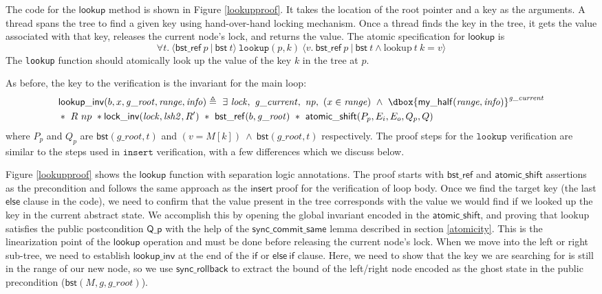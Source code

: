 \documentclass[acmsmall,screen]{acmart}\settopmatter{printfolios=true}
\newcommand\dboxed[1]{\dbox{\ensuremath{#1}}}
\newcommand{\ghost}[2]{\ensuremath{\dboxed{#1}^{#2}}}
\newcommand{\treerep}{\ensuremath{\mathsf{bst}}}
\newcommand{\nodeboxrep}{\ensuremath{\mathsf{bst\_ref}}}
\begin{document}
The code for the $\mathsf{lookup}$ method is shown in Figure
\ref{lookupproof}. It takes the location of the root pointer and a key
as the arguments. A thread spans the tree to find a given key using
hand-over-hand locking mechanism. Once a thread finds the key in the
tree, it gets the value associated with that key, releases the current
node's lock, and returns the value.
The atomic specification for $\mathsf{lookup}$ is
$$\forall t.\ \langle \nodeboxrep\ p\ |\ \treerep\ t\rangle\ \texttt{lookup}(p, k)\ \langle v.\ \nodeboxrep\ p\ |\ \treerep\ t \land \mathrm{lookup}\ t\ k = v\rangle$$
The \texttt{lookup} function should atomically look up the value of the key $k$ in the tree at $p$.

As before, the key to the verification is the invariant for the main loop:
\begin{align*} &\mathsf{lookup\_inv}(b, x, \mathit{g\_root}, \mathit{range},\mathit{info}) \triangleq\ \exists\ \mathit{lock},\ \mathit{g\_current},\ \mathit{np},\ (x\in \mathit{range})\ \land \ \ghost{\mathsf{my\_half}(\mathit{range},\mathit{info})}{\mathit{g\_current}}\\& *\ R\ np\ * \mathsf{lock\_inv}(\mathit{lock},\mathit{lsh2},R')\ *\ \nodeboxrep(b,\mathit{g\_root})\ *\ \mathsf{atomic\_shift} (P_p,E_i,E_o,Q_p,Q) \end{align*}
where $P_p$ and $Q_p$ are $\treerep(g\_root, t)$ and $(v =
M[k])\ \wedge\ \treerep(g\_root, t)$ respectively. The proof steps for
the $\texttt{lookup}$ verification are similar to the steps
used in $\texttt{insert}$ verification, with a few differences which we
discuss below.

Figure \ref{lookupproof} shows the $\mathsf{lookup}$ function
with separation logic annotations. The proof starts with
$\nodeboxrep$ and $\mathsf{atomic\_shift}$ assertions as the
precondition and follows the same approach as the $\mathsf{insert}$
proof for the verification of loop body. Once we find the target key
(the last $\mathsf{else}$ clause in the code), we need
to confirm that the value present in the tree corresponds with the value we would find if we looked up the key in the current abstract state. We accomplish this by opening the global
invariant encoded in the $\mathsf{atomic\_shift}$, and proving that
lookup satisfies the public postcondition $\mathsf{Q\_p}$ with the help
of the $\mathsf{sync\_commit\_same}$ lemma described in section
\ref{atomicity}. This is the linearization point of the
$\mathsf{lookup}$ operation and must be done before releasing the
current node's lock. When we move into the left or right sub-tree,
we need to establish $\mathsf{lookup\_inv}$ at the end of the $\mathsf{if}$
or $\mathsf{else\ if}$ clause. Here, we need to show that the key we
are searching for is still in the range of our new node, so we use
$\mathsf{sync\_rollback}$ to extract the bound of the left/right
node encoded as the ghost state in the public precondition
($\treerep(M, g, g\_root)$).
\end{document}
